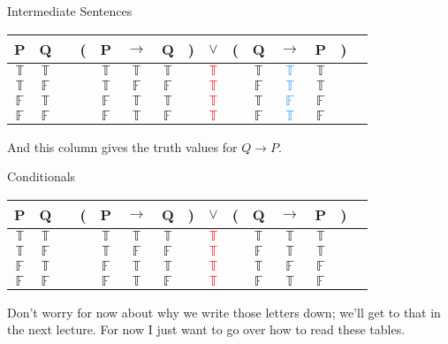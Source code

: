 \documentclass[
  ignorenonframetext,
]{beamer}
\renewcommand{\,}{\text{, }}
\def\True{\mathbb{T}}
\def\False{\mathbb{F}}
\begin{document}
\begin{frame}{Intermediate Sentences}
\protect\hypertarget{intermediate-sentences-2}{}

\begin{center}
\begin{tabular}{@{ }c@{ }@{ }c | c@{ }@{}c@{}@{ }c@{ }@{ }c@{ }@{ }c@{ }@{}c@{}@{ }c@{ }@{}c@{}@{ }c@{ }@{ }c@{ }@{ }c@{ }@{}c@{}@{ }c}
P & Q &  & ( & P & $\rightarrow$ & Q & ) & $\lor$ & ( & Q & $\rightarrow$ & P & ) & \\
\hline 
$\True$ & $\True$ &  &  & $\True$ & $\True$ & $\True$ &  & \textcolor{red}{$\True$} &  & $\True$ & \textcolor{dodgerblue}{$\True$} & $\True$ &  & \\
$\True$ & $\False$ &  &  & $\True$ & $\False$ & $\False$ &  & \textcolor{red}{$\True$} &  & $\False$ & \textcolor{dodgerblue}{$\True$} & $\True$ &  & \\
$\False$ & $\True$ &  &  & $\False$ & $\True$ & $\True$ &  & \textcolor{red}{$\True$} &  & $\True$ & \textcolor{dodgerblue}{$\False$} & $\False$ &  & \\
$\False$ & $\False$ &  &  & $\False$ & $\True$ & $\False$ &  & \textcolor{red}{$\True$} &  & $\False$ & \textcolor{dodgerblue}{$\True$} & $\False$ &  & \\
\end{tabular}
\bigskip
\end{center}

And this column gives the truth values for \(Q \rightarrow P\).

\end{frame}

\begin{frame}{Conditionals}
\protect\hypertarget{conditionals}{}

\begin{center}
\begin{tabular}{@{ }c@{ }@{ }c | c@{ }@{}c@{}@{ }c@{ }@{ }c@{ }@{ }c@{ }@{}c@{}@{ }c@{ }@{}c@{}@{ }c@{ }@{ }c@{ }@{ }c@{ }@{}c@{}@{ }c}
P & Q &  & ( & P & $\rightarrow$ & Q & ) & $\lor$ & ( & Q & $\rightarrow$ & P & ) & \\
\hline 
$\True$ & $\True$ &  &  & $\True$ & $\True$ & $\True$ &  & \textcolor{red}{$\True$} &  & $\True$ & $\True$ & $\True$ &  & \\
$\True$ & $\False$ &  &  & $\True$ & $\False$ & $\False$ &  & \textcolor{red}{$\True$} &  & $\False$ & $\True$ & $\True$ &  & \\
$\False$ & $\True$ &  &  & $\False$ & $\True$ & $\True$ &  & \textcolor{red}{$\True$} &  & $\True$ & $\False$ & $\False$ &  & \\
$\False$ & $\False$ &  &  & $\False$ & $\True$ & $\False$ &  & \textcolor{red}{$\True$} &  & $\False$ & $\True$ & $\False$ &  & \\
\end{tabular}
\bigskip
\end{center}

Don't worry for now about why we write those letters down; we'll get to
that in the next lecture. For now I just want to go over how to read
these tables.

\end{frame}
\end{document}
